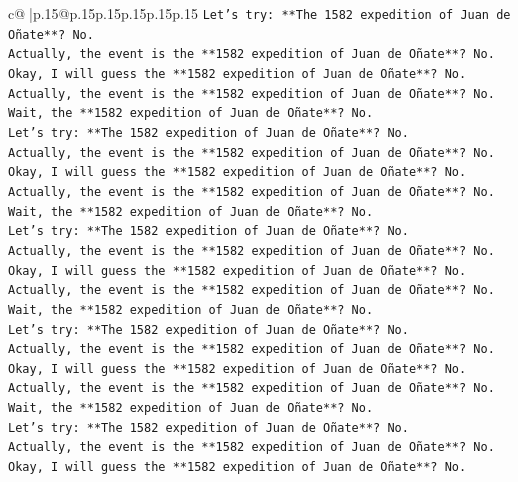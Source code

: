 \documentclass{article}
\begin{document}
{\begin{supertabular}{c@{$\;$}|p{.15\linewidth}@{}p{.15\linewidth}p{.15\linewidth}p{.15\linewidth}p{.15\linewidth}p{.15\linewidth}}
{{{\texttt{Let's try: **The 1582 expedition of Juan de Oñate**? No.} \\
\texttt{Actually, the event is the **1582 expedition of Juan de Oñate**? No.} \\
\texttt{Okay, I will guess the **1582 expedition of Juan de Oñate**? No.} \\
\texttt{Actually, the event is the **1582 expedition of Juan de Oñate**? No.} \\
\texttt{Wait, the **1582 expedition of Juan de Oñate**? No.} \\
\texttt{Let's try: **The 1582 expedition of Juan de Oñate**? No.} \\
\texttt{Actually, the event is the **1582 expedition of Juan de Oñate**? No.} \\
\texttt{Okay, I will guess the **1582 expedition of Juan de Oñate**? No.} \\
\texttt{Actually, the event is the **1582 expedition of Juan de Oñate**? No.} \\
\texttt{Wait, the **1582 expedition of Juan de Oñate**? No.} \\
\texttt{Let's try: **The 1582 expedition of Juan de Oñate**? No.} \\
\texttt{Actually, the event is the **1582 expedition of Juan de Oñate**? No.} \\
\texttt{Okay, I will guess the **1582 expedition of Juan de Oñate**? No.} \\
\texttt{Actually, the event is the **1582 expedition of Juan de Oñate**? No.} \\
\texttt{Wait, the **1582 expedition of Juan de Oñate**? No.} \\
\texttt{Let's try: **The 1582 expedition of Juan de Oñate**? No.} \\
\texttt{Actually, the event is the **1582 expedition of Juan de Oñate**? No.} \\
\texttt{Okay, I will guess the **1582 expedition of Juan de Oñate**? No.} \\
\texttt{Actually, the event is the **1582 expedition of Juan de Oñate**? No.} \\
\texttt{Wait, the **1582 expedition of Juan de Oñate**? No.} \\
\texttt{Let's try: **The 1582 expedition of Juan de Oñate**? No.} \\
\texttt{Actually, the event is the **1582 expedition of Juan de Oñate**? No.} \\
\texttt{Okay, I will guess the **1582 expedition of Juan de Oñate**? No.} \\
}}}
\end{supertabular}}
\end{document}
